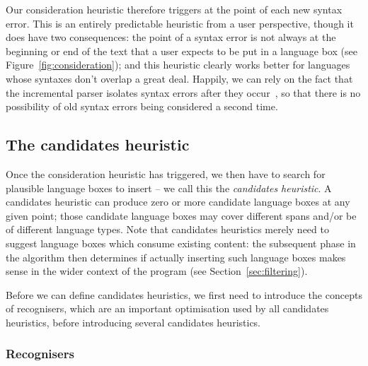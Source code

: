 \documentclass[sigplan,screen]{acmart}\settopmatter{printfolios=true,printccs=false,printacmref=false}
\begin{document}
Our consideration heuristic therefore triggers at the point of each new syntax error.
This is an entirely predictable heuristic from a user perspective, though it
does have two consequences: the point of a syntax error is not always at the
beginning or end of the text that a user expects to be put in a language box
(see Figure~\ref{fig:consideration}); and this heuristic clearly works better
for languages whose syntaxes don't overlap a great deal. Happily, we can rely
on the fact that the incremental parser isolates syntax errors after they
occur~\cite[p.~93]{wagner98practicalalgorithms}, so that there is no
possibility of old syntax errors being considered a second time.


\subsection{The candidates heuristic}

Once the consideration heuristic has triggered, we then have to search for
plausible language boxes to insert -- we call this the \emph{candidates heuristic}. A candidates heuristic
can produce zero or more candidate language boxes at any given point; those
candidate language boxes may cover different spans and/or be of different
language types. Note that candidates heuristics merely need to suggest language
boxes which consume existing content: the subsequent phase in the algorithm
then determines if actually inserting such language boxes makes sense in the
wider context of the program (see Section~\ref{sec:filtering}).

Before we can define candidates heuristics, we first need to introduce the
concepts of recognisers, which are an important optimisation used by all
candidates heuristics, before introducing several candidates heuristics.


\subsubsection{Recognisers}
\end{document}
